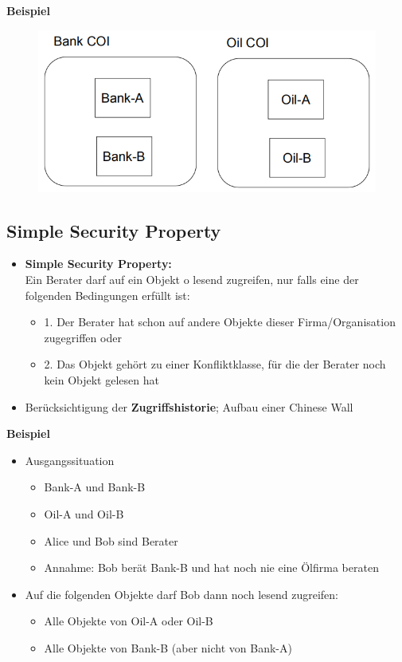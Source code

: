 \documentclass[openany]{book}
\begin{document}
\newpage

\textbf{Beispiel}

\begin{figure}[h!]
\centering
\includegraphics[width=0.85\linewidth]{Pics/COIs.PNG}
\end{figure}

\subsection{Simple Security Property}

\begin{itemize}
\item \textbf{Simple Security Property:} \\ Ein Berater darf auf ein Objekt o lesend zugreifen, nur falls eine der folgenden Bedingungen erfüllt ist:
\begin{itemize}
\item 1. Der Berater hat schon auf andere Objekte dieser Firma/Organisation zugegriffen oder
\item 2. Das Objekt gehört zu einer Konfliktklasse, für die der Berater noch kein Objekt gelesen hat
\end{itemize}
\item Berücksichtigung der \textbf{Zugriffshistorie}; Aufbau einer Chinese Wall
\end{itemize}

\textbf{Beispiel}

\begin{itemize}
\item Ausgangssituation
\begin{itemize}
\item Bank-A und Bank-B
\item Oil-A und Oil-B
\item Alice und Bob sind Berater
\item Annahme: Bob berät Bank-B und hat noch nie eine Ölfirma beraten
\end{itemize}
\item Auf die folgenden Objekte darf Bob dann noch lesend zugreifen:
\begin{itemize}
\item Alle Objekte von Oil-A oder Oil-B
\item Alle Objekte von Bank-B (aber nicht von Bank-A)
\end{itemize}
\end{itemize}
\end{document}
